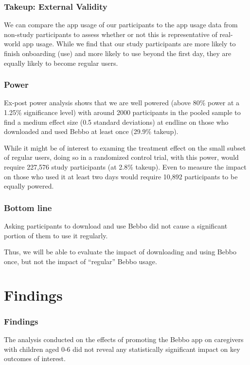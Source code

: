\documentclass[aspectratio=169]{beamer}
\begin{document}
\begin{frame}[shrink=25]
  \frametitle{Takeup: External Validity}



We can compare the app usage of our participants to the app usage data from non-study participants to assess whether or not this is representative of real-world app usage. While we find that our study participants are more likely to finish onboarding (use) and more likely to use beyond the first day, they are equally likely to become regular users.

\end{frame}



\begin{frame}
  \frametitle{Power}

Ex-post power analysis shows that we are well powered (above 80\% power at a 1.25\% significance level) with around 2000 participants in the pooled sample to find a medium effect size (0.5 standard deviations) at endline on those who downloaded and used Bebbo at least once (29.9\% takeup).

While it might be of interest to examing the treatment effect on the small subset of regular users, doing so in a randomized control trial, with this power, would require 227,576 study participants (at 2.8\% takeup). Even to measure the impact on those who used it at least two days would require 10,892 participants to be equally powered. 

\end{frame}

\begin{frame}
  \frametitle{Bottom line}

Asking participants to download and use Bebbo did not cause a significant portion of them to use it regularly.

Thus, we will be able to evaluate the impact of downloading and using Bebbo once, but not the impact of ``regular'' Bebbo usage.

\end{frame}

\section{Findings}

\begin{frame}
\frametitle{Findings}
 
The analysis conducted on the effects of promoting the Bebbo app on caregivers with children aged 0-6 did not reveal any statistically significant impact on key outcomes of interest. 

\end{frame}
\end{document}
